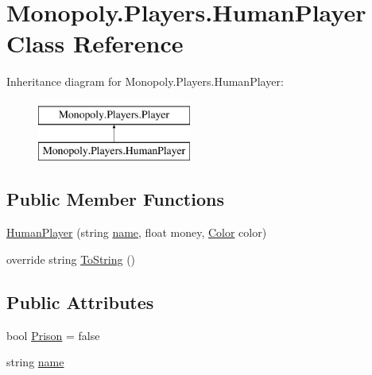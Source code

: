 \hypertarget{class_monopoly_1_1_players_1_1_human_player}{}\section{Monopoly.\+Players.\+Human\+Player Class Reference}
\label{class_monopoly_1_1_players_1_1_human_player}
Inheritance diagram for Monopoly.\+Players.\+Human\+Player\+:\begin{figure}[H]
\begin{center}
\leavevmode
\includegraphics[height=2.000000cm]{class_monopoly_1_1_players_1_1_human_player}
\end{center}
\end{figure}
\subsection*{Public Member Functions}
\begin{DoxyCompactItemize}
\item 
\mbox{\hyperlink{class_monopoly_1_1_players_1_1_human_player_a60418b330c94d88b4a00b79f59b85f53}{Human\+Player}} (string \mbox{\hyperlink{class_monopoly_1_1_players_1_1_player_a554b9887d583e93fc182fb5cf43a08c8}{name}}, float money, \mbox{\hyperlink{class_monopoly_1_1_players_1_1_player_afcfd5b9c28b6ba4ce1e60e2e3baf7e31}{Color}} color)
\item 
override string \mbox{\hyperlink{class_monopoly_1_1_players_1_1_player_a7f052d67464f27df644c9b2a903593ba}{To\+String}} ()
\end{DoxyCompactItemize}
\subsection*{Public Attributes}
\begin{DoxyCompactItemize}
\item 
bool \mbox{\hyperlink{class_monopoly_1_1_players_1_1_player_a308be52351bb6ad3e287e24f2fb04999}{Prison}} = false
\item 
string \mbox{\hyperlink{class_monopoly_1_1_players_1_1_player_a554b9887d583e93fc182fb5cf43a08c8}{name}}
\end{DoxyCompactItemize}
